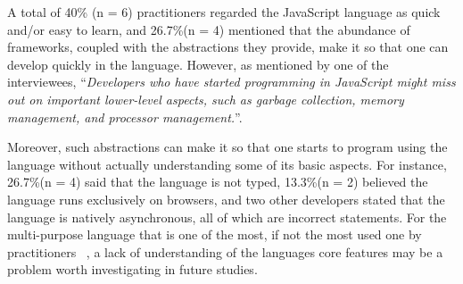 

A total of 40\% (n = 6) practitioners regarded the JavaScript language as quick and/or easy to learn, and 26.7\%(n = 4) mentioned that the abundance of frameworks, coupled with the abstractions they provide, make it so that one can develop quickly in the language. However, as mentioned by one of the interviewees, ``\emph{Developers who have started programming in JavaScript might miss out on important lower-level aspects, such as garbage collection, memory management, and processor management.}''. 

Moreover, such abstractions can make it so that one starts to program using the language without actually understanding some of its basic aspects. For instance, 26.7\%(n = 4) said that the language is not typed, 13.3\%(n = 2) believed the language runs exclusively on browsers, and two other developers stated that the language is natively asynchronous, all of which are incorrect statements. For the multi-purpose language that is one of the most, if not the most used one by practitioners
~\cite{}, a lack of understanding of the languages core features may be a problem worth investigating in future studies.



